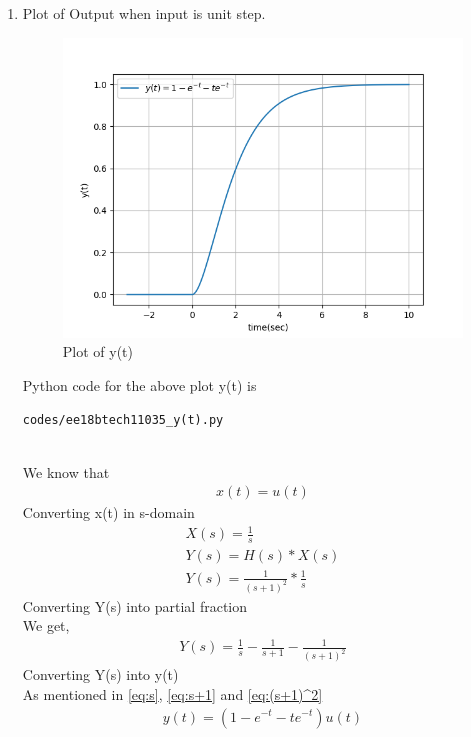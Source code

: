 \begin{enumerate}[label=\thesection.\arabic*.,ref=\thesection.\theenumi]
\item Plot of Output when input is unit step.
\\ \solution
\begin{figure}[!h]
  \includegraphics[width=\columnwidth]{./figures/ee18btech11035_y(t).png}
 \caption{Plot of y(t)}
  \label{fig:ee18btech11035_y(t)}
\end{figure}

Python code for the above plot y(t) is
\begin{lstlisting}
codes/ee18btech11035_y(t).py
\end{lstlisting}


\\
We know that
\begin{align}
x(t) = u(t)
\end{align}
Converting x(t) in s-domain 
\begin{align}
X(s) = \frac{1}{s}\\
Y(s) = H(s)*X(s)\\
Y(s) = \frac{1}{(s+1)^2}*\frac{1}{s}
\end{align}
Converting Y(s) into partial fraction\\
We get,
\begin{align}
Y(s) = \frac{1}{s}-\frac{1}{s+1}-\frac{1}{(s+1)^2}
\end{align}
Converting Y(s) into y(t)\\
As mentioned in \eqref{eq:s}, \eqref{eq:s+1} and \eqref{eq:(s+1)^2}\\
\begin{align}
y(t) = (1-e^{-t}-te^{-t})u(t)
\end{align}


\end{enumerate}